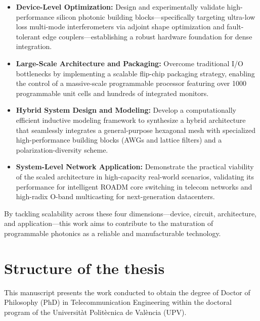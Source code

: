 \begin{itemize}
    \item \textbf{Device-Level Optimization:} Design and experimentally validate high-performance 
	silicon photonic building blocks—specifically targeting ultra-low loss multi-mode 
	interferometers via adjoint shape optimization and fault-tolerant edge couplers—establishing a 
	robust hardware foundation for dense integration.

    \item \textbf{Large-Scale Architecture and Packaging:} Overcome traditional I/O bottlenecks by 
	implementing a scalable flip-chip packaging strategy, enabling the control of a massive-scale 
	programmable processor featuring over 1000 programmable unit cells and hundreds of integrated 
	monitors.

    \item \textbf{Hybrid System Design and Modeling:} Develop a computationally efficient inductive 
	modeling framework to synthesize a hybrid architecture that seamlessly integrates a 
	general-purpose hexagonal mesh with specialized high-performance building blocks (AWGs and 
	lattice filters) and a polarization-diversity scheme.

    \item \textbf{System-Level Network Application:} Demonstrate the practical viability of the 
	scaled architecture in high-capacity real-world scenarios, validating its performance for 
	intelligent ROADM core switching in telecom networks and high-radix O-band multicasting for 
	next-generation datacenters.
\end{itemize}

By tackling scalability across these four dimensions---device, circuit, architecture, and 
application---this work aims to contribute to the maturation of programmable photonics as a 
reliable and manufacturable technology.




\section{Structure of the thesis} \label{sec:structure} 
This manuscript presents the work conducted to obtain the degree of Doctor of Philosophy (PhD) in 
Telecommunication Engineering within the doctoral program of the Universitàt Politècnica de 
València (UPV).

